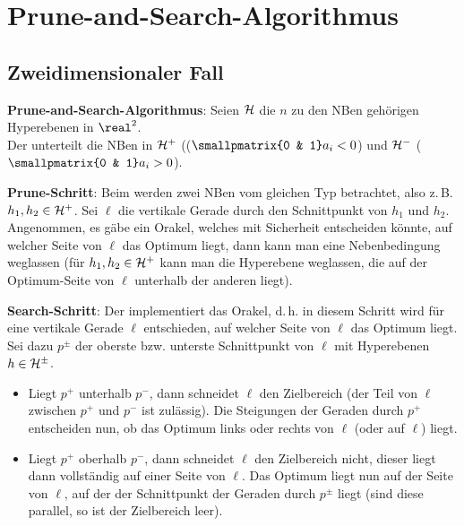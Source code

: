 \pagebreak

\section{%
    Prune-and-Search-Algorithmus%
}

\subsection{%
    Zweidimensionaler Fall%
}

\textbf{Prune-and-Search-Algorithmus}:
Seien $\mathcal{H}$ die $n$ zu den NBen gehörigen Hyperebenen in $\real^2$.\\
Der  unterteilt die NBen in
 $\mathcal{H}^+$ (($\smallpmatrix{0 & 1} a_i < 0$) und
 $\mathcal{H}^-$ ($\smallpmatrix{0 & 1} a_i > 0$).

\textbf{Prune-Schritt}:
Beim  werden zwei NBen vom gleichen Typ betrachtet,
also z.\,B. $h_1, h_2 \in \mathcal{H}^+$.
Sei $\ell$ die vertikale Gerade durch den Schnittpunkt von $h_1$ und $h_2$.
Angenommen, es gäbe ein Orakel, welches mit Sicherheit entscheiden könnte, auf welcher Seite
von $\ell$ das Optimum liegt, dann kann man eine Nebenbedingung weglassen
(für $h_1, h_2 \in \mathcal{H}^+$ kann man die Hyperebene weglassen, die auf der Optimum-Seite von $\ell$
unterhalb der anderen liegt).

\textbf{Search-Schritt}:
Der  implementiert das Orakel,
d.\,h. in diesem Schritt wird für eine vertikale Gerade $\ell$ entschieden,
auf welcher Seite von $\ell$ das Optimum liegt.\\
Sei dazu $p^\pm$ der oberste bzw. unterste Schnittpunkt von $\ell$ mit Hyperebenen $h \in \mathcal{H}^\pm$.
\begin{itemize}
    \item
    Liegt $p^+$ unterhalb $p^-$, dann schneidet $\ell$ den Zielbereich
    (der Teil von $\ell$ zwischen $p^+$ und $p^-$ ist zulässig).
    Die Steigungen der Geraden durch $p^+$ entscheiden nun, ob das Optimum links oder
    rechts von $\ell$ (oder auf $\ell$) liegt.

    \item
    Liegt $p^+$ oberhalb $p^-$, dann schneidet $\ell$ den Zielbereich nicht, dieser liegt dann
    vollständig auf einer Seite von $\ell$.
    Das Optimum liegt nun auf der Seite von $\ell$, auf der der Schnittpunkt der Geraden durch
    $p^\pm$ liegt
    (sind diese parallel, so ist der Zielbereich leer).
\end{itemize}

